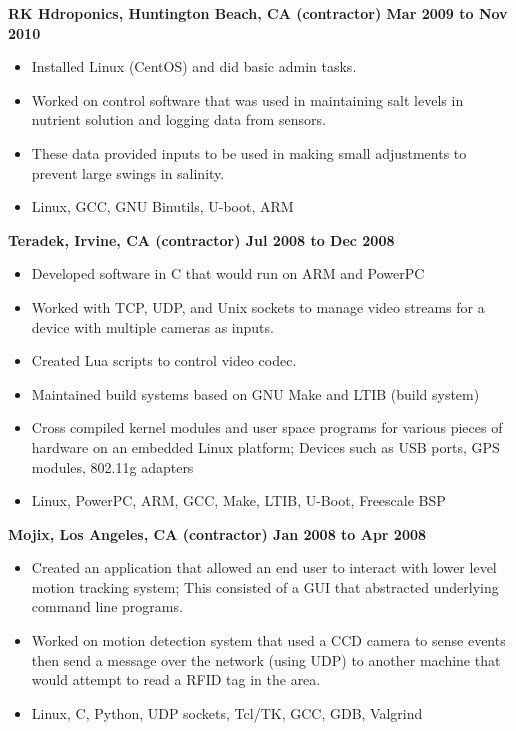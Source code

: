 \documentclass{res}
\begin{document}
\begin{resume}
{\large \bf RK Hdroponics, Huntington Beach, CA (contractor) \hfill Mar 2009 to Nov 2010}
\begin{itemize}
\item Installed Linux (CentOS) and did basic admin tasks.
\item Worked on control software that was used in maintaining salt
levels in nutrient solution and logging data from sensors.
\item These data provided inputs to be used in making small adjustments
to prevent large swings in salinity.
\item Linux, GCC, GNU Binutils, U-boot, ARM
\end{itemize}


{\large \bf Teradek, Irvine, CA (contractor) \hfill Jul 2008 to Dec 2008}
\begin{itemize}
\item Developed software in C that would run on ARM and PowerPC
\item Worked with TCP, UDP, and Unix sockets to manage video streams for
a device with multiple cameras as inputs.
\item Created Lua scripts to control video codec.
\item Maintained build systems based on GNU Make and LTIB (build system)
\item Cross compiled kernel modules and user space programs for various
pieces of hardware on an embedded Linux platform; Devices such as USB
ports, GPS modules, 802.11g adapters
\item  Linux, PowerPC, ARM, GCC, Make, LTIB, U-Boot, Freescale BSP
\end{itemize}

{\large \bf Mojix, Los Angeles, CA (contractor) \hfill Jan 2008 to Apr 2008}
\begin{itemize}

\item Created an application that allowed an end user to interact
with lower level motion tracking system; This consisted of a GUI
that abstracted underlying command line programs.

\item Worked on motion detection system that used a CCD camera to sense
events then send a message over the network (using UDP) to another
machine that would attempt to read a RFID tag in the area.

\item Linux, C, Python, UDP sockets, Tcl/TK, GCC, GDB, Valgrind
\end{itemize}


\end{resume}
\end{document}
